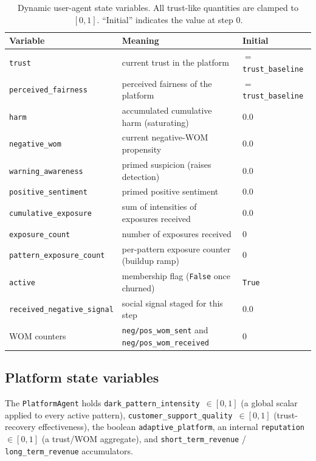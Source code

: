 \documentclass[11pt]{article}
\newcommand{\code}[1]{\texttt{#1}}
\begin{document}
\begin{table}[!ht]
\centering
\caption{Dynamic user-agent state variables. All trust-like quantities are
clamped to $[0,1]$. ``Initial'' indicates the value at step 0.}
\label{tab:dynamic}
\small
\begin{tabular}{lp{5.8cm}l}
\toprule
Variable & Meaning & Initial \\
\midrule
\code{trust}                 & current trust in the platform                  & $=$\,\code{trust\_baseline} \\
\code{perceived\_fairness}   & perceived fairness of the platform             & $=$\,\code{trust\_baseline} \\
\code{harm}                  & accumulated cumulative harm (saturating)       & $0.0$ \\
\code{negative\_wom}         & current negative-WOM propensity                & $0.0$ \\
\code{warning\_awareness}    & primed suspicion (raises detection)            & $0.0$ \\
\code{positive\_sentiment}   & primed positive sentiment                      & $0.0$ \\
\code{cumulative\_exposure}  & sum of intensities of exposures received       & $0.0$ \\
\code{exposure\_count}       & number of exposures received                   & $0$ \\
\code{pattern\_exposure\_count} & per-pattern exposure counter (buildup ramp) & $0$ \\
\code{active}                & membership flag (\code{False} once churned)    & \code{True} \\
\code{received\_negative\_signal} & social signal staged for this step        & $0.0$ \\
WOM counters                 & \code{neg/pos\_wom\_sent} and \code{neg/pos\_wom\_received} & $0$ \\
\bottomrule
\end{tabular}
\end{table}

\subsection{Platform state variables}

The \code{PlatformAgent} holds \code{dark\_pattern\_intensity}~$\in[0,1]$
(a global scalar applied to every active pattern),
\code{customer\_support\_quality}~$\in[0,1]$ (trust-recovery effectiveness),
the boolean \code{adaptive\_platform}, an internal \code{reputation}~$\in[0,1]$
(a trust/WOM aggregate), and \code{short\_term\_revenue} /
\code{long\_term\_revenue} accumulators.
\end{document}
